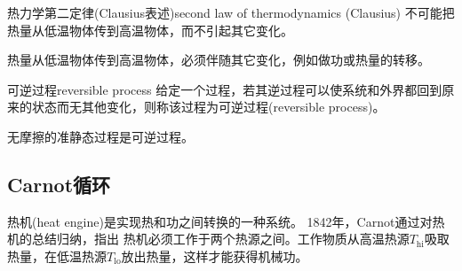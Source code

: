 \begin{theorem}
	{热力学第二定律(Clausius表述)}{second law of thermodynamics (Clausius)}
	不可能把热量从低温物体传到高温物体，而不引起其它变化。
\end{theorem}

\begin{corollary}
	热量从低温物体传到高温物体，必须伴随其它变化，例如做功或热量的转移。
\end{corollary}

\begin{definition}
	{可逆过程}{reversible process}
	给定一个过程，若其逆过程可以使系统和外界都回到原来的状态而无其他变化，则称该过程为可逆过程(reversible process)。
\end{definition}

\begin{corollary}
	无摩擦的准静态过程是可逆过程。
\end{corollary}

\subsection{Carnot循环}

\newcommand{\hi}{_{\mathrm{hi}}}
\newcommand{\lo}{_{\mathrm{lo}}}

热机(heat engine)是实现热和功之间转换的一种系统。
1842年，Carnot通过对热机的总结归纳，指出
热机必须工作于两个热源之间。工作物质从高温热源$T\hi$吸取热量，在低温热源$T\lo$放出热量，这样才能获得机械功。

